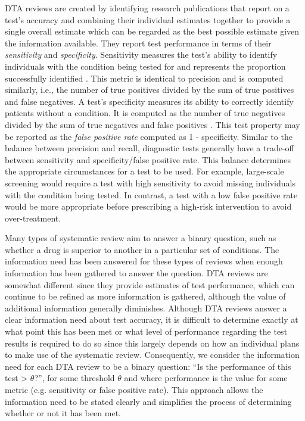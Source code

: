 \documentclass[sigconf,natbib=true,anonymous=true]{acmart}
\begin{document}
DTA reviews are created by identifying research publications that report on a test’s accuracy and combining their individual estimates together to provide a single overall estimate which can be regarded as the best possible estimate given the information available. They report test performance in terms of their {\it sensitivity} and {\it specificity}. Sensitivity measures the test's ability to identify individuals with the condition being tested for and represents the proportion successfully identified \cite{altman_diagnostic_1994}. This metric is identical to precision and is computed similarly, i.e., the number of true positives divided by the sum of true positives and false negatives. A test's specificity measures its ability to correctly identify patients without a condition. It is computed as the number of true negatives divided by the sum of true negatives and false positives \cite{fawcett_introduction_2006}. This test property may be reported as the {\it false positive rate} computed as 1 - specificity. Similar to the balance between precision and recall, diagnostic tests generally have a trade-off between sensitivity and specificity/false positive rate. This balance determines the appropriate circumstances for a test to be used. For example, large-scale screening would require a test with high sensitivity to avoid missing individuals with the condition being tested. In contrast, a test with a low false positive rate would be more appropriate before prescribing a high-risk intervention to avoid over-treatment. 

Many types of systematic review aim to answer a binary question, such as whether a drug is superior to another in a particular set of conditions. The information need has been answered for these types of reviews when enough information has been gathered to answer the question. DTA reviews are somewhat different since they provide estimates of test performance, which can continue to be refined as more information is gathered, although the value of additional information generally diminishes. Although DTA reviews answer a clear information need about test accuracy, it is difficult to determine exactly at what point this has been met or what level of performance regarding the test results is required to do so since this largely depends on how an individual plans to make use of the systematic review. Consequently, we consider the information need for each DTA review to be a binary question: “Is the performance of this test > $\theta$?”, for some threshold $\theta$ and where performance is the value for some metric (e.g. sensitivity or false positive rate). This approach allows the information need to be stated clearly and simplifies the process of determining whether or not it has been met. 
\end{document}
